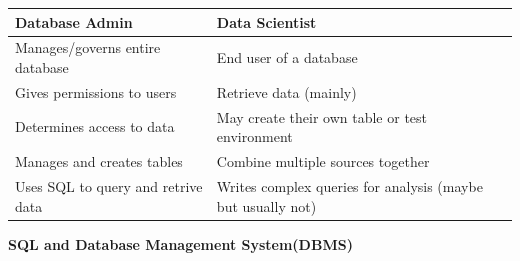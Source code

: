 \documentclass[]{book}
\theoremstyle{definition}
\theoremstyle{definition}
\theoremstyle{remark}
\begin{document}
\begin{longtable}[]{@{}ll@{}}
\toprule
\begin{minipage}[b]{0.22\columnwidth}\raggedright\strut
Database Admin\strut
\end{minipage} & \begin{minipage}[b]{0.22\columnwidth}\raggedright\strut
Data Scientist\strut
\end{minipage}\tabularnewline
\midrule
\endhead
\begin{minipage}[t]{0.22\columnwidth}\raggedright\strut
Manages/governs entire database\strut
\end{minipage} & \begin{minipage}[t]{0.22\columnwidth}\raggedright\strut
End user of a database\strut
\end{minipage}\tabularnewline
\begin{minipage}[t]{0.22\columnwidth}\raggedright\strut
Gives permissions to users\strut
\end{minipage} & \begin{minipage}[t]{0.22\columnwidth}\raggedright\strut
Retrieve data (mainly)\strut
\end{minipage}\tabularnewline
\begin{minipage}[t]{0.22\columnwidth}\raggedright\strut
Determines access to data\strut
\end{minipage} & \begin{minipage}[t]{0.22\columnwidth}\raggedright\strut
May create their own table or test environment\strut
\end{minipage}\tabularnewline
\begin{minipage}[t]{0.22\columnwidth}\raggedright\strut
Manages and creates tables\strut
\end{minipage} & \begin{minipage}[t]{0.22\columnwidth}\raggedright\strut
Combine multiple sources together\strut
\end{minipage}\tabularnewline
\begin{minipage}[t]{0.22\columnwidth}\raggedright\strut
Uses SQL to query and retrive data\strut
\end{minipage} & \begin{minipage}[t]{0.22\columnwidth}\raggedright\strut
Writes complex queries for analysis (maybe but usually not)\strut
\end{minipage}\tabularnewline
\bottomrule
\end{longtable}

\textbf{SQL and Database Management System(DBMS)}
\end{document}
